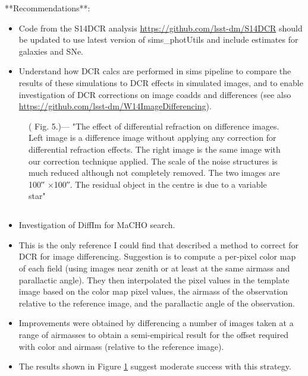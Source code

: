 \documentclass[DM,authoryear,toc]{lsstdoc}
\begin{document}
**Recommendations**:
\begin{itemize}
	\item Code from the S14DCR analysis
          \url{https://github.com/lsst-dm/S14DCR} should be updated to
          use latest version of sims\_photUtils and include estimates
          for galaxies and SNe.
	\item Understand how DCR calcs are performed in sims pipeline
          to compare the results of these simulations to DCR effects
          in simulated images, and to enable investigation of DCR
          corrections on image coadds and differences (see also
          \url{https://github.com/lsst-dm/W14ImageDifferencing}).
\end{itemize}


\begin{figure}[t!]
	\begin{center}
		\caption{(\citeauthor{AlcockDiffIm1999} Fig. 5.)— "The effect of differential refraction on difference images. Left image is a difference image without applying any correction for differential refraction effects. The right image is the same image with our correction technique applied. The scale of the noise structures is much reduced although not completely removed. The two images are 100′′ ×100′′. The residual object in the centre is due to a variable star"}
		\label{Fig:Alcock5}
	\end{center}
\end{figure}


\subsection{\cite{AlcockDiffIm1999}}
\begin{itemize}
	\item Investigation of DiffIm for MaCHO search.
	\item This is the only reference I could find that described a method
	to correct for DCR for image differencing. Suggestion is to compute a
	per-pixel color map of each field (using images near zenith or at
	least at the same airmass and parallactic angle). They then
	interpolated the pixel values in the template image based on the
	color map pixel values, the airmass of the observation relative to
	the reference image, and the parallactic angle of the observation.
	\item Improvements were obtained by differencing a number of images
	taken at a range of airmasses to obtain a semi-empirical result for
	the offset required with color and airmass (relative to the
	reference image).
	\item The results shown in Figure \ref{Fig:Alcock5} suggest moderate success with this
	strategy.
\end{itemize}
\end{document}
